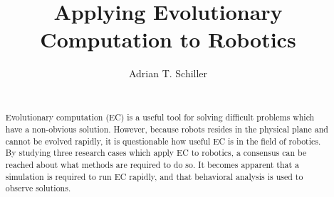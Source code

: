 \documentclass{sig-alternate}
\begin{document}
%

\title{
Applying Evolutionary Computation to Robotics}
%
%
%
%
%

%
\author{
%
%
\alignauthor
Adrian T. Schiller \\
 \\
}

\maketitle
\begin{abstract}
  Evolutionary computation (EC) is a useful tool for solving difficult problems which have a non-obvious solution. However, because robots resides in the physical plane and cannot be evolved rapidly, it is questionable how useful EC is in the field of robotics. By studying three research cases which apply EC to robotics, a consensus can be reached about what methods are required to do so. It becomes apparent that a simulation is required to run EC rapidly, and that behavioral analysis is used to observe solutions. 
\end{abstract}
\end{document}
